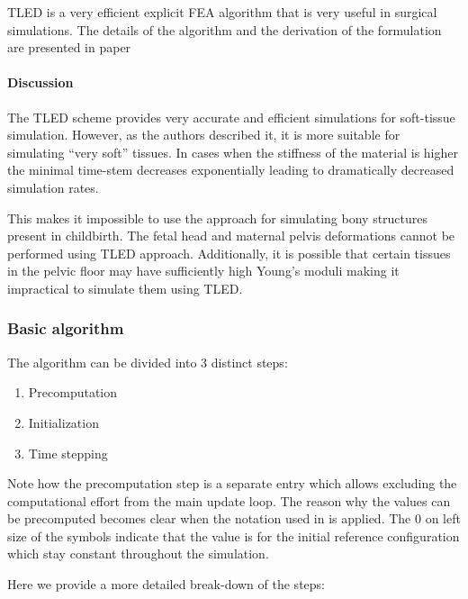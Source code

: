  TLED is a very efficient explicit FEA algorithm that is very useful in surgical simulations. The details of the algorithm and the derivation of the formulation are presented in paper \cite{Miller2007}

\paragraph{Discussion} The TLED scheme provides very accurate and efficient simulations for soft-tissue simulation. However, as the authors described it, it is more suitable for simulating ``very soft'' tissues. In cases when the stiffness of the material is higher the minimal time-stem decreases exponentially leading to dramatically decreased simulation rates.

This makes it impossible to use the approach for simulating bony structures present in childbirth. The fetal head and maternal pelvis deformations cannot be performed using TLED approach. Additionally, it is possible that certain tissues in the pelvic floor may have sufficiently high Young's moduli making it impractical to simulate them using TLED.

\subsubsection{Basic algorithm} \label{fea-algorithm}

The algorithm can be divided into 3 distinct steps:

\begin{enumerate}

  \item Precomputation
  \item Initialization
  \item Time stepping

\end{enumerate}

Note how the precomputation step is a separate entry which allows excluding the computational effort from the main update loop. The reason why the values can be precomputed becomes clear when the notation used in \cite{bathe:1996} is applied. The $0$ on left size of the symbols indicate that the value is for the initial reference configuration which stay constant throughout the simulation.

Here we provide a more detailed break-down of the steps:

